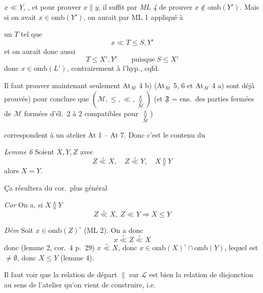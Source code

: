 \documentclass[11pt,a4paper]{article}
\begin{document}
 $x \ll Y$, , et pour prouver  $x \parallel y$, il suffit par \emph{ML 4} de prouver $x \notin \mathrm{omb}(Y')$. Mais si on avait $x \in \mathrm{omb}(Y')$, on aurait  par ML 1 appliqué à


un $T$ tel que
\[
  x \ll T \leq S, Y'
\]
et on aurait donc aussi
\[
  T \leq X', Y' \qquad \text{puisque}\ S \leq X'
\]
donc $x \in \mathrm{omb}(L')$, contrairement à l'hyp., cqfd.

\struck{\ill{}} Il faut prouver maintenant \struck{\ill{}} seulement At$_{\mathcal{M}}$ 4  b) (At$_{\mathcal{M}}$ 5, 6 et At$_{\mathcal{M}}$ 4 a) sont déjà prouvés) pour conclure que $(\mathcal{M}, \leq, \ll, \underset{\mathcal{M}}{\between})$ (et  $\mathfrak{F}$ = ens.\ des parties fermées de $\mathcal{M}$ formées d'él.\ 2 à 2 compatibles pour $\underset{\mathcal{M}}{\between}$)

\struck{\ill{}} correspondent à un atelier At 1 -- At 7. Donc c'est le contenu du

\emph{Lemme 6} Soient $X, Y, Z$ avec
\[
  Z \mathrel{\overset{\circ}{\ll}} X, \quad Z \mathrel{\overset{\circ}{\ll}} Y, \quad X \between Y
\]
alors $X = Y$.

Ça résultera du cor.\ plus général

\emph{Cor} On a, si $X \between Y$
\[
  Z \mathrel{\overset{\circ}{\ll}} X, \ Z \ll Y \Longrightarrow X \leq Y
\]

\emph{Dém} Soit $x \in \mathrm{omb}(Z)^{\circ}$ (ML 2). On a donc 
\[
  x \mathrel{\overset{\circ}{\ll}} Z \mathrel{\overset{\circ}{\ll}} X
\]
donc (lemme 2, cor.~4 p.~29) $x \mathrel{\overset{\circ}{\ll}} X$, donc $x \in \mathrm{omb}(X)^{\circ} \cap \mathrm{omb}(Y)$, lequel est $\neq \emptyset$, donc $X \leq Y$ (lemme 4).

Il faut voir que la relation de départ $\parallel$ sur $\mathcal{L}$ est bien la relation de disjonction au sens de l'atelier qu'on vient de construire, i.e.
\end{document}
